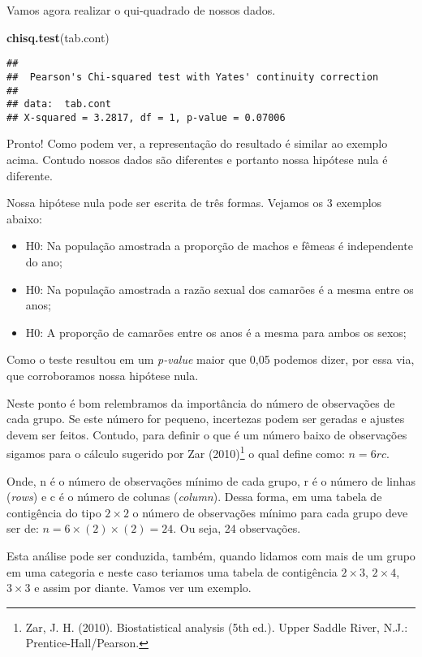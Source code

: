 \documentclass[14pt,titlepage, oneside, openany, a4paper]{book}
\newenvironment{Shaded}{\begin{snugshade}}{\end{snugshade}}
\newcommand{\KeywordTok}[1]{\textcolor[rgb]{0.13,0.29,0.53}{\textbf{#1}}}
\newcommand{\NormalTok}[1]{#1}
\providecommand{\tightlist}{%
  \setlength{\itemsep}{0pt}\setlength{\parskip}{0pt}}
\begin{document}
Vamos agora realizar o qui-quadrado de nossos dados.

\begin{Shaded}
\begin{Highlighting}[]
\KeywordTok{chisq.test}\NormalTok{(tab.cont)}
\end{Highlighting}
\end{Shaded}

\begin{verbatim}
## 
##  Pearson's Chi-squared test with Yates' continuity correction
## 
## data:  tab.cont
## X-squared = 3.2817, df = 1, p-value = 0.07006
\end{verbatim}

Pronto! Como podem ver, a representação do resultado é similar ao exemplo acima. Contudo nossos dados são diferentes e portanto nossa hipótese nula é diferente.

Nossa hipótese nula pode ser escrita de três formas. Vejamos os 3 exemplos abaixo:

\begin{itemize}
\tightlist
\item
  H0: Na população amostrada a proporção de machos e fêmeas é independente do ano;
\item
  H0: Na população amostrada a razão sexual dos camarões é a mesma entre os anos;
\item
  H0: A proporção de camarões entre os anos é a mesma para ambos os sexos;
\end{itemize}

Como o teste resultou em um \emph{p-value} maior que 0,05 podemos dizer, por essa via, que corroboramos nossa hipótese nula.

Neste ponto é bom relembramos da importância do número de observações de cada grupo. Se este número for pequeno, incertezas podem ser geradas e ajustes devem ser feitos. Contudo, para definir o que é um número baixo de observações sigamos para o cálculo sugerido por Zar (2010)\footnote{Zar, J. H. (2010). Biostatistical analysis (5th ed.). Upper Saddle River, N.J.: Prentice-Hall/Pearson.} o qual define como: \(n = 6rc\).

Onde, n é o número de observações mínimo de cada grupo, r é o número de linhas (\emph{rows}) e c é o número de colunas (\emph{column}). Dessa forma, em uma tabela de contigência do tipo \(2 \times 2\) o número de observações mínimo para cada grupo deve ser de: \(n = 6 \times (2) \times (2) = 24\). Ou seja, 24 observações.

Esta análise pode ser conduzida, também, quando lidamos com mais de um grupo em uma categoria e neste caso teriamos uma tabela de contigência \(2 \times 3\), \(2 \times 4\), \(3 \times 3\) e assim por diante. Vamos ver um exemplo.
\end{document}
